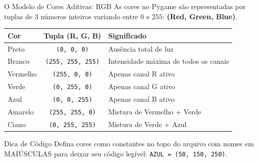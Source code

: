 \begin{frame}{O Modelo de Cores Aditivas: RGB}
    As cores no Pygame são representadas por tuplas de 3 números inteiros variando entre $0$ e $255$: \textbf{(Red, Green, Blue)}.

    \vspace{0.3cm}
    \begin{table}[h]
        \centering
        \small
        \begin{tabular}{l c l}
            \toprule
            \textbf{Cor} & \textbf{Tupla (R, G, B)} & \textbf{Significado} \\
            \midrule
            Preto & \texttt{(0, 0, 0)} & Ausência total de luz \\
            Branco & \texttt{(255, 255, 255)} & Intensidade máxima de todos os canais \\
            Vermelho & \texttt{(255, 0, 0)} & Apenas canal R ativo \\
            Verde & \texttt{(0, 255, 0)} & Apenas canal G ativo \\
            Azul & \texttt{(0, 0, 255)} & Apenas canal B ativo \\
            Amarelo & \texttt{(255, 255, 0)} & Mistura de Vermelho + Verde \\
            Ciano & \texttt{(0, 255, 255)} & Mistura de Verde + Azul \\
            \bottomrule
        \end{tabular}
    \end{table}

    \begin{block}{Dica de Código}
        Defina cores como constantes no topo do arquivo com nomes em MAIÚSCULAS para deixar seu código legível: \texttt{AZUL = (50, 150, 250)}.
    \end{block}
\end{frame}

